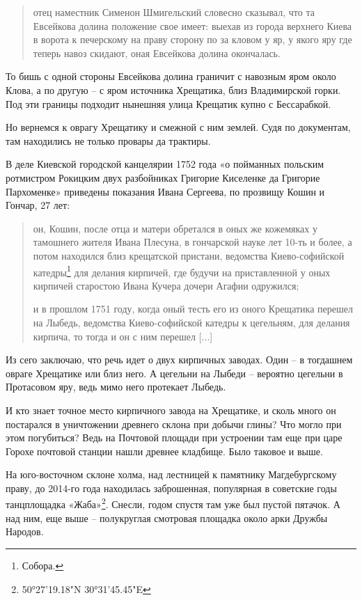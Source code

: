 \begin{quotation}
отец наместник Сименон Шмигельский словесно сказывал, что та Евсейкова долина положение свое имеет: выехав из города верхнего Киева в ворота к печерскому на праву сторону по за кловом у яр, у якого яру где теперь навоз скидают, оная Евсейкова долина окончалась.
\end{quotation}

То бишь с одной стороны Евсейкова долина граничит с навозным яром около Клова, а по другую – с яром источника Хрещатика, близ Владимирской горки. Под эти границы подходит нынешняя улица Крещатик купно с Бессарабкой.

Но вернемся к оврагу Хрещатику и смежной с ним землей. Судя по документам, там находились не только провары да трактиры.
 
В деле Киевской городской канцелярии 1752 года «о пойманных польским ротмистром Рокицким двух разбойниках Григорие Киселенке да Григорие Пархоменке» приведены показания Ивана Сергеева, по прозвищу Кошин и Гончар, 27 лет: 

\begin{quotation}
он, Кошин,  после отца и матери обретался в оных же кожемяках у тамошнего жителя Ивана Плесуна, в гончарской науке лет 10-ть и более, а потом находился близ крещатской пристани, ведомства Киево-софийской катедры\footnote{Собора.} для делания кирпичей, где будучи на приставленной у оных кирпичей старостою Ивана Кучера дочери Агафии одружился; 

и в прошлом 1751 году, когда оный тесть его из оного Крещатика перешел на Лыбедь, ведомства Киево-софийской катедры к цегельням, для делания кирпича, то тогда и он с ним перешел [...]
\end{quotation} 

Из сего заключаю, что речь идет о двух кирпичных заводах. Один – в тогдашнем овраге Хрещатике или близ него. А цегельни на Лыбеди – вероятно цегельни в Протасовом яру, ведь мимо него протекает Лыбедь.

И кто знает точное место кирпичного завода на Хрещатике, и сколь много он постарался в уничтожении древнего склона при добычи глины? Что могло при этом погубиться? Ведь на Почтовой площади при устроении там еще при царе Горохе почтовой станции нашли древнее кладбище. Было таковое и выше.

На юго-восточном склоне холма, над лестницей к памятнику Магдебургскому праву, до 2014-го года находилась заброшенная, популярная в советские годы танцплощадка «Жаба»\footnote{50°27'19.18"N 30°31'45.45"E}. Снесли, годом спустя там уже был пустой пятачок. А над ним, еще выше – полукруглая смотровая площадка около арки Дружбы Народов. 


